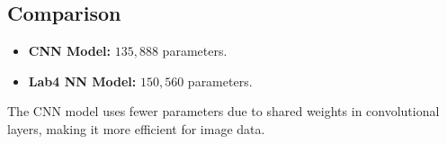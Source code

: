 \documentclass[12pt]{article}
\begin{document}
\subsection*{Comparison}
\begin{itemize}[topsep=0pt, itemsep=0pt]
    \item \textbf{CNN Model:} \(135,888\) parameters.
    \item \textbf{Lab4 NN Model:} \(150,560\) parameters.
\end{itemize}

The CNN model uses fewer parameters due to shared weights in convolutional layers, making it more efficient for image data.
\end{document}
